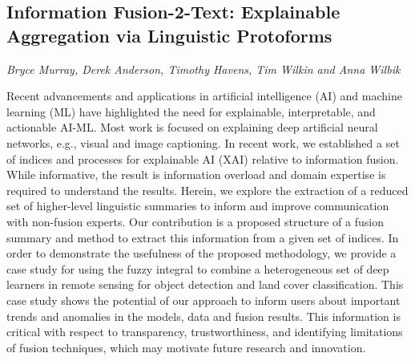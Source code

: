 \documentclass[../booklet.tex]{subfiles}
\begin{document}
\subsection[Information Fusion-2-Text: Explainable Aggregation via Linguistic Protoforms. {\it Bryce Murray, Derek Anderson, Timothy Havens, Tim Wilkin and Anna Wilbik}]{Information Fusion-2-Text: Explainable Aggregation via Linguistic Protoforms}
    

\begin{center}
  {\it Bryce Murray, Derek Anderson, Timothy Havens, Tim Wilkin and Anna Wilbik}
\end{center}




Recent advancements and applications in artificial intelligence (AI) and machine learning (ML) have highlighted the need for explainable, interpretable, and actionable AI-ML. Most work is focused on explaining deep artificial neural networks, e.g., visual and image captioning. In recent work, we established a set of indices and processes for explainable AI (XAI) relative to information fusion. While informative, the result is information overload and domain expertise is required to understand the results. Herein, we explore the extraction of a reduced set of higher-level linguistic summaries to inform and improve communication with non-fusion experts. Our contribution is a proposed structure of a fusion summary and method to extract this information from a given set of indices. In order to demonstrate the usefulness of the proposed methodology, we provide a case study for using the fuzzy integral to combine a heterogeneous set of deep learners in remote sensing for object detection and land cover classification.
This case study shows the potential of our approach to inform users about important trends and anomalies in the models, data and fusion results. This information is critical with respect to transparency, trustworthiness, and identifying limitations of fusion techniques, which may motivate future research and innovation.

\end{document}
